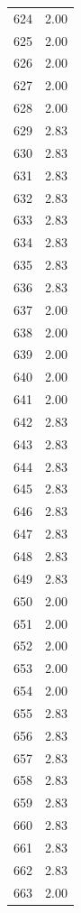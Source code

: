 \documentclass[a4paper,11pt]{article}
\begin{document}
\begin{center}
\begin{longtable}{|R{1.5cm}|R{2.5cm}|}
  624  &         2.00 \\ 
  625  &         2.00 \\ 
  626  &         2.00 \\ 
  627  &         2.00 \\ 
  628  &         2.00 \\ 
  629  &         2.83 \\ 
  630  &         2.83 \\ 
  631  &         2.83 \\ 
  632  &         2.83 \\ 
  633  &         2.83 \\ 
  634  &         2.83 \\ 
  635  &         2.83 \\ 
  636  &         2.83 \\ 
  637  &         2.00 \\ 
  638  &         2.00 \\ 
  639  &         2.00 \\ 
  640  &         2.00 \\ 
  641  &         2.00 \\ 
  642  &         2.83 \\ 
  643  &         2.83 \\ 
  644  &         2.83 \\ 
  645  &         2.83 \\ 
  646  &         2.83 \\ 
  647  &         2.83 \\ 
  648  &         2.83 \\ 
  649  &         2.83 \\ 
  650  &         2.00 \\ 
  651  &         2.00 \\ 
  652  &         2.00 \\ 
  653  &         2.00 \\ 
  654  &         2.00 \\ 
  655  &         2.83 \\ 
  656  &         2.83 \\ 
  657  &         2.83 \\ 
  658  &         2.83 \\ 
  659  &         2.83 \\ 
  660  &         2.83 \\ 
  661  &         2.83 \\ 
  662  &         2.83 \\ 
  663  &         2.00 \\ 

\end{longtable}
\end{center}
\end{document}
